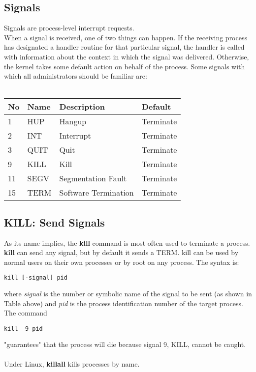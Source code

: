 \documentclass[10pt,letterpaper]{book}
\begin{document}
\subsection{Signals}
Signals are process-level interrupt requests.\\
When a signal is received, one of two things can happen. If the receiving process
has designated a handler routine for that particular signal, the handler is called
with information about the context in which the signal was delivered. Otherwise,
the kernel takes some default action on behalf of the process.
Some signals with which all administrators should be familiar are:\\
\\
\begin{tabular}{l l l l}
\hline
\textbf{No} & \textbf{Name} & \textbf{Description} & \textbf{Default}\\
\hline 
1 & HUP & Hangup & Terminate\\
2 & INT & Interrupt & Terminate\\
3 & QUIT & Quit & Terminate\\
9 & KILL & Kill & Terminate\\
11 & SEGV & Segmentation Fault & Terminate\\
15 & TERM & Software Termination & Terminate\\
\hline
\end{tabular}
\subsection{KILL: Send Signals}
As its name implies, the \textbf{kill} command is most often used to terminate a process.\\
\textbf{kill} can send any signal, but by default it sends a TERM. kill can be used by normal users on their own processes or by root on any process. The syntax is:
\begin{lstlisting}
kill [-signal] pid
\end{lstlisting}
where \textit{signal} is the number or symbolic name of the signal to be sent (as shown in Table above) and \textit{pid} is the process identification number of the target process.\\
The command
\begin{lstlisting}
kill -9 pid
\end{lstlisting}
"guarantees" that the process will die because signal 9, KILL, cannot be caught.\\
\\
Under Linux, \textbf{killall} kills processes by name.
\end{document}
